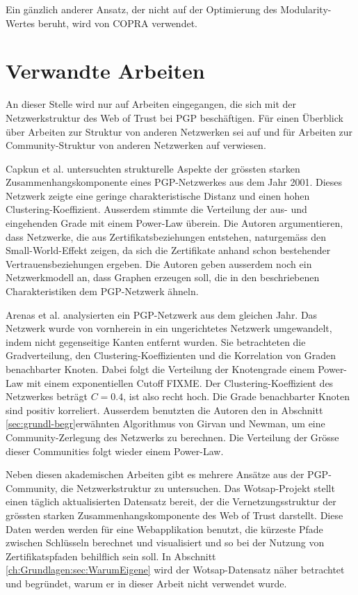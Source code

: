 Ein g\"anzlich anderer Ansatz, der nicht auf der Optimierung des
Modularity-Wertes beruht, wird von COPRA\cite{Gregory2010} verwendet.

\section{Verwandte Arbeiten}
\label{ch:Grundlagen:sec:RelatedWork}

An dieser Stelle wird nur auf Arbeiten eingegangen, die sich mit der
Netzwerkstruktur des Web of Trust bei PGP besch\"aftigen. F\"ur einen
\"Uberblick \"uber Arbeiten zur Struktur von anderen Netzwerken sei
auf \cite{newman:167}und f\"ur Arbeiten zur Community-Struktur von
anderen Netzwerken auf \cite{Fortunato2010} verwiesen.

Capkun et al. \cite{Capkun2002} untersuchten strukturelle Aspekte der
gr\"ossten starken Zusammenhangskomponente eines PGP-Netzwerkes aus
dem Jahr 2001. Dieses Netzwerk zeigte eine geringe charakteristische
Distanz und einen hohen Clustering-Koeffizient. Ausserdem stimmte die
Verteilung der aus- und eingehenden Grade mit einem Power-Law
\"uberein. Die Autoren argumentieren, dass Netzwerke, die aus
Zertifikatsbeziehungen entstehen, naturgem\"ass den Small-World-Effekt
zeigen, da sich die Zertifikate anhand schon bestehender
Vertrauensbeziehungen ergeben. Die Autoren geben ausserdem noch ein
Netzwerkmodell an, dass Graphen erzeugen soll, die in den
beschriebenen Charakteristiken dem PGP-Netzwerk \"ahneln.

Arenas et al. \cite{Boguna2004} analysierten ein PGP-Netzwerk aus dem
gleichen Jahr. Das Netzwerk wurde von vornherein in ein ungerichtetes
Netzwerk umgewandelt, indem nicht gegenseitige Kanten entfernt
wurden. Sie betrachteten die Gradverteilung, den
Clustering-Koeffizienten und die Korrelation von Graden benachbarter
Knoten. Dabei folgt die Verteilung der Knotengrade einem Power-Law mit
einem exponentiellen Cutoff FIXME. Der Clustering-Koeffizient des
Netzwerkes betr\"agt $C=0.4$, ist also recht hoch. Die Grade
benachbarter Knoten sind positiv korreliert. Ausserdem benutzten die
Autoren den in Abschnitt \ref{sec:grundl-begr}erw\"ahnten Algorithmus
von Girvan und Newman, um eine Community-Zerlegung des Netzwerks zu
berechnen. Die Verteilung der Gr\"osse dieser Communities folgt wieder
einem Power-Law.

Neben diesen akademischen Arbeiten gibt es mehrere Ans\"atze aus der
PGP-Community, die Netzwerkstruktur zu untersuchen. Das
Wotsap-Projekt\cite{Cederlof} stellt einen t\"aglich aktualisierten
Datensatz bereit, der die Vernetzungsstruktur der gr\"ossten starken
Zusammenhangskomponente des Web of Trust darstellt. Diese Daten werden
werden f\"ur eine Webapplikation benutzt, die k\"urzeste Pfade
zwischen Schl\"usseln berechnet und visualisiert und so bei der
Nutzung von Zertifikatspfaden behilflich sein soll. In Abschnitt
\ref{ch:Grundlagen:sec:WarumEigene} wird der Wotsap-Datensatz n\"aher
betrachtet und begr\"undet, warum er in dieser Arbeit nicht verwendet
wurde. 

